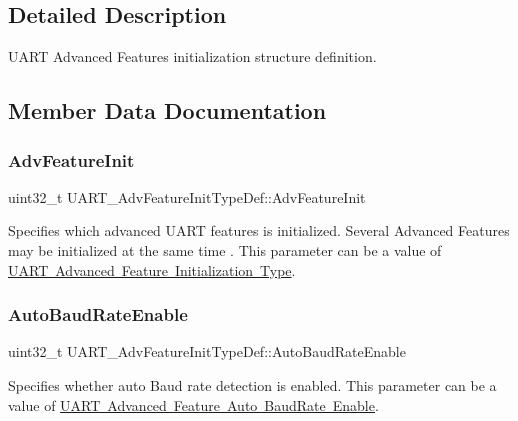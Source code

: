 \subsection{Detailed Description}
U\+A\+RT Advanced Features initialization structure definition. 

\subsection{Member Data Documentation}
\mbox{\label{struct_u_a_r_t___adv_feature_init_type_def_a3182d0787600d70cb3c2a9d68a86e645}} 
\subsubsection{\texorpdfstring{AdvFeatureInit}{AdvFeatureInit}}
{\footnotesize\ttfamily uint32\+\_\+t U\+A\+R\+T\+\_\+\+Adv\+Feature\+Init\+Type\+Def\+::\+Adv\+Feature\+Init}

Specifies which advanced U\+A\+RT features is initialized. Several Advanced Features may be initialized at the same time . This parameter can be a value of \mbox{\hyperlink{group___u_a_r_t___advanced___features___initialization___type}{U\+A\+RT Advanced Feature Initialization Type}}. \mbox{\label{struct_u_a_r_t___adv_feature_init_type_def_aa329d2b83700bfe0de99708eb3f7a465}} 
\subsubsection{\texorpdfstring{AutoBaudRateEnable}{AutoBaudRateEnable}}
{\footnotesize\ttfamily uint32\+\_\+t U\+A\+R\+T\+\_\+\+Adv\+Feature\+Init\+Type\+Def\+::\+Auto\+Baud\+Rate\+Enable}

Specifies whether auto Baud rate detection is enabled. This parameter can be a value of \mbox{\hyperlink{group___u_a_r_t___auto_baud_rate___enable}{U\+A\+RT Advanced Feature Auto Baud\+Rate Enable}}. \mbox{\label{struct_u_a_r_t___adv_feature_init_type_def_a2f962d68e84dd709079aadcadd9d11cc}} 
